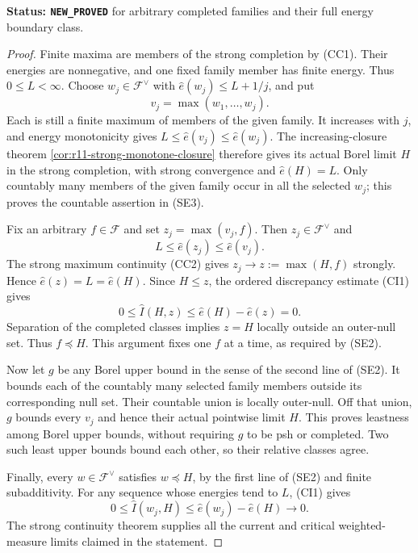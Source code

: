 \documentclass[11pt,a4paper]{article}
\numberwithin{equation}{section}
\theoremstyle{definition}
\theoremstyle{remark}
\begin{document}
\noindent\textbf{Status: \texttt{NEW\_PROVED}} for arbitrary
completed families and their full energy boundary class.

\begin{proof}
Finite maxima are members of the strong completion by (CC1).
Their energies are nonnegative, and one fixed family member
has finite energy. Thus $0\leq L<\infty$.
Choose $w_j\in\mathscr F^\vee$ with
$\widehat e(w_j)\leq L+1/j$, and put
\[
                            v_j=\max(w_1,\ldots,w_j).
 \tag{SE4}
\]
Each is still a finite maximum of members of the given family.
It increases with $j$, and energy monotonicity gives
$L\leq\widehat e(v_j)\leq\widehat e(w_j)$.
The increasing-closure theorem
\ref{cor:r11-strong-monotone-closure} therefore gives its
actual Borel limit $H$ in the strong completion, with strong
convergence and $\widehat e(H)=L$.
Only countably many members of the given family occur in all the
selected $w_j$; this proves the countable assertion in (SE3).

Fix an arbitrary $f\in\mathscr F$ and set $z_j=\max(v_j,f)$.
Then $z_j\in\mathscr F^\vee$ and
\[
                       L\leq\widehat e(z_j)
                                      \leq\widehat e(v_j).
\]
The strong maximum continuity (CC2) gives
$z_j\to z:=\max(H,f)$ strongly. Hence
$\widehat e(z)=L=\widehat e(H)$.
Since $H\leq z$, the ordered discrepancy estimate (CI1)
gives
\[
               0\leq\widehat I(H,z)
                      \leq\widehat e(H)-\widehat e(z)=0.
 \tag{SE5}
\]
Separation of the completed classes implies $z=H$
locally outside an outer-null set. Thus $f\preceq H$.
This argument fixes one $f$ at a time, as required by (SE2).

Now let $g$ be any Borel upper bound in the sense of the
second line of (SE2). It bounds each of the countably many
selected family members outside its corresponding null set.
Their countable union is locally outer-null. Off that union,
$g$ bounds every $v_j$ and hence their actual pointwise
limit $H$. This proves leastness among Borel upper bounds,
without requiring $g$ to be psh or completed.
Two such least upper bounds bound each other, so their
relative classes agree.

Finally, every $w\in\mathscr F^\vee$ satisfies $w\preceq H$,
by the first line of (SE2) and finite subadditivity.
For any sequence whose energies tend to $L$, (CI1) gives
\[
             0\leq\widehat I(w_j,H)
                    \leq\widehat e(w_j)-\widehat e(H)
                                      \longrightarrow0.
 \tag{SE6}
\]
The strong continuity theorem supplies all the current and
critical weighted-measure limits claimed in the statement.
\end{proof}
\end{document}
